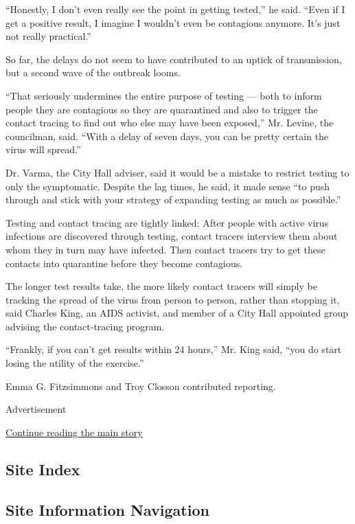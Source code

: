 ``Honestly, I don't even really see the point in getting tested,'' he
said. ``Even if I get a positive result, I imagine I wouldn't even be
contagious anymore. It's just not really practical.''

So far, the delays do not seem to have contributed to an uptick of
transmission, but a second wave of the outbreak looms.

``That seriously undermines the entire purpose of testing --- both to
inform people they are contagious so they are quarantined and also to
trigger the contact tracing to find out who else may have been
exposed,'' Mr. Levine, the councilman, said. ``With a delay of seven
days, you can be pretty certain the virus will spread.''

Dr. Varma, the City Hall adviser, said it would be a mistake to restrict
testing to only the symptomatic. Despite the lag times, he said, it made
sense ``to push through and stick with your strategy of expanding
testing as much as possible.''

Testing and contact tracing are tightly linked: After people with active
virus infections are discovered through testing, contact tracers
interview them about whom they in turn may have infected. Then contact
tracers try to get these contacts into quarantine before they become
contagious.

The longer test results take, the more likely contact tracers will
simply be tracking the spread of the virus from person to person, rather
than stopping it, said Charles King, an AIDS activist, and member of a
City Hall appointed group advising the contact-tracing program.

``Frankly, if you can't get results within 24 hours,'' Mr. King said,
``you do start losing the utility of the exercise.''

Emma G. Fitzsimmons and Troy Closson contributed reporting.

Advertisement

\protect\hyperlink{after-bottom}{Continue reading the main story}

\hypertarget{site-index}{%
\subsection{Site Index}\label{site-index}}

\hypertarget{site-information-navigation}{%
\subsection{Site Information
Navigation}\label{site-information-navigation}}

